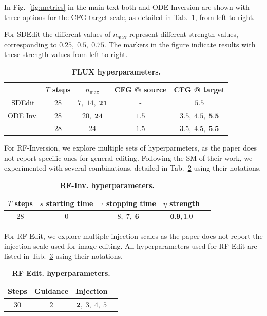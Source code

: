 In Fig.~\ref{fig:metrics} in the main text both \ours{} and ODE Inversion are shown with three options for the CFG target scale, as detailed in Tab.~\ref{tab:hyperparams-flux}, from left to right. 

For SDEdit the different values of $n_{\text{max}}$ represent different strength values, corresponding to $0.25,\;0.5,\;0.75$. The markers in the figure indicate results with these strength values from left to right. 

\begin{table}[h]
\centering
\caption{\textbf{FLUX hyperparameters.}}
\label{tab:hyperparams-flux}
\begin{tabular}{@{}ccccc@{}}
\toprule
 & $T$ steps & $n_{\text{max}} $ & CFG @ source & CFG @ target \\ \midrule
SDEdit & $28$ &  $7,\;14,\;\textbf{21}$ & -  & $5.5$  \\
ODE Inv. & $28$ & $20,\;\textbf{24}$ & $1.5$ & $3.5,\;4.5,\;\textbf{5.5}$     \\
\ours{} & $28$ & $24$ & $1.5$ & $3.5,\;4.5,\;\textbf{5.5}$     \\
\bottomrule
\end{tabular}
\end{table}

For RF-Inversion, we explore multiple sets of hyperparmeters, as the paper does not report specific ones for general editing. Following the SM of their work, we experimented with several combinations, detailed in Tab.~\ref{tab:hyperparams-rf-inv} using their notations.

\begin{table}[h]
\centering
\caption{\textbf{RF-Inv. hyperparameters.}}
\label{tab:hyperparams-rf-inv}
\begin{tabular}{@{}ccccc@{}}
\toprule
$T$ steps & $s$ starting time & $\tau$ stopping time & $\eta$ strength \\ \midrule
$28$ &  $0$ & $8,\;7,\;\textbf{6}$  & $\textbf{0.9}, 1.0$  \\
\bottomrule
\end{tabular}
\end{table}

For RF Edit, we explore multiple injection scales as the paper does not report the injection scale used for image editing. All hyperparameters used for RF Edit are listed in Tab.~\ref{tab:hyperparams-rf-edit} using their notations.

\begin{table}[h]
\centering
\caption{\textbf{RF Edit. hyperparameters.}}
\label{tab:hyperparams-rf-edit}
\begin{tabular}{@{}cccc@{}}
\toprule
Steps & Guidance & Injection \\ \midrule
$30$ &  $2$ & $\textbf{2},\;3,\;4,\;5$   \\
\bottomrule
\end{tabular}
\end{table}

